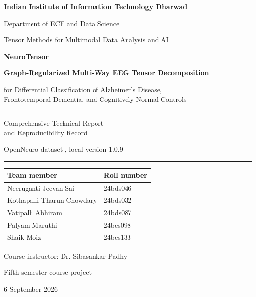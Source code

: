 \begin{titlepage}
\thispagestyle{empty}
\begin{center}
{\large\bfseries Indian Institute of Information Technology Dharwad}\par
\vspace{3mm}
Department of ECE and Data Science\par
\vspace{12mm}
{\large Tensor Methods for Multimodal Data Analysis and AI}\par
\vspace{14mm}
{\Huge\bfseries NeuroTensor}\par
\vspace{6mm}
{\LARGE\bfseries Graph-Regularized Multi-Way EEG Tensor Decomposition}\par
\vspace{5mm}
{\large for Differential Classification of Alzheimer's Disease,\\
Frontotemporal Dementia, and Cognitively Normal Controls}\par
\vspace{9mm}
\rule{0.85\textwidth}{0.6pt}\par
\vspace{3mm}
{\large Comprehensive Technical Report\\and Reproducibility Record}\par
\vspace{3mm}
OpenNeuro dataset , local version 1.0.9\par
\rule{0.85\textwidth}{0.6pt}\par
\vspace{12mm}
\begin{tabular}{ll}
\toprule
\textbf{Team member} & \textbf{Roll number}\\
\midrule
Neeruganti Jeevan Sai & 24bds046\\
Kothapalli Tharun Chowdary & 24bds032\\
Vatipalli Abhiram & 24bds087\\
Palyam Maruthi & 24bcs098\\
Shaik Moiz & 24bcs133\\
\bottomrule
\end{tabular}
\vspace{13mm}\par
Course instructor: Dr. Sibasankar Padhy\par
Fifth-semester course project\par
\vfill
6 September 2026
\end{center}
\end{titlepage}
